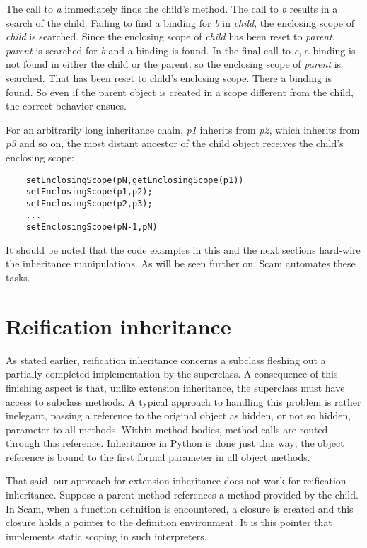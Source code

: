 The call to {\it a} immediately finds the child's method.  The call to
{\it b} results in a search of the child. Failing to find a binding
for {\it b} in {\it child}, the enclosing scope of {\it child} is
searched. Since the enclosing scope of {\it child} has been reset to {\it
parent}, {\it parent} is searched for {\it b} and a binding is found.
In the final call to {\it c}, a binding is not found in either the
child or the parent, so the enclosing scope of {\it parent} is searched.
That has been reset to {\sc child}'s enclosing scope. There a binding
is found. So even if the parent object is created in a scope different
from the child, the correct behavior ensues.

For an arbitrarily long inheritance chain, {\it p1} inherits from {\it
p2}, which inherits from {\it p3} and so on, the most distant ancestor
of the child object receives the child's enclosing scope:

\begin{verbatim}
    setEnclosingScope(pN,getEnclosingScope(p1))
    setEnclosingScope(p1,p2);
    setEnclosingScope(p2,p3);
    ...
    setEnclosingScope(pN-1,pN)
\end{verbatim}

It should be noted that the code examples in this and the next sections
hard-wire the inheritance manipulations. As will be seen further on,
Scam automates these tasks.

\section{Reification inheritance}

As stated earlier, reification inheritance concerns a subclass fleshing
out a partially completed implementation by the superclass. A consequence
of this finishing aspect is that, unlike extension inheritance, the
superclass must have access to subclass methods.  A typical approach
to handling this problem is rather inelegant, passing a reference to
the original object as hidden, or not so hidden,
parameter to all methods.  Within method
bodies, method calls are routed through this reference. Inheritance in
Python is done just this way; the object reference is bound to the
first formal parameter in all object methods.

That said, our approach for extension inheritance
does not work for reification inheritance. Suppose a parent method
references a method provided by the child. In Scam,
when a function definition is encountered, a closure is
created and this closure holds a pointer to the definition environment. It
is this pointer that implements static scoping in such interpreters.

